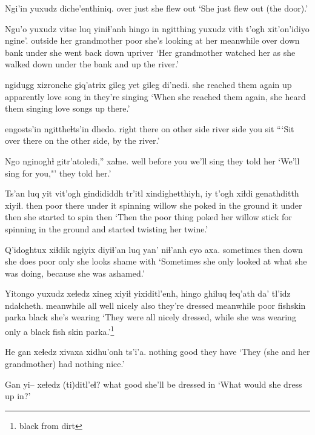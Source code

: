 \documentclass[12pt]{article}
\begin{document}
\gll Ngi'in yuxudz diche'enthiniq.
over   just  {she flew out}
\glt `She just flew out (the door).'
\glend

\gll Ngu'o yuxudz vitse           luq  yiniɬ'anh            hingo in ngitthing yuxudz vith t'ogh xit'on'idiyo       ngine'. 
outside {}    {her grandmother} poor {she's looking at her} meanwhile over   down  {}    bank under {she went back down} upriver
\glt `Her grandmother watched her as she walked down under the bank and up the river.'
\glend

 ngidugg xizronche {giq'atrix gileg} yet {gileg di'nedi.}
{{she reached them again}} up      apparently        {love  song}    in  {they're singing}
\glt `When she reached them again, she heard them singing love songs up there.'
\glend

     engosts'in      ngittheɬts'in  dhedo.
{right there} {on other side} {river side}   {you sit} 
\glt ```Sit over there on the other side, by the river.'
\glend

\gll Ngo  nginoghɬ   gitr'atoledi,'' xaɬne.
well {before you} {we'll sing}  {they told her}
\glt `We'll sing for you,"' they told her.'
\glend

\gll Ts'an luq yit   vit'ogh  gindididdh tr'itl xindighetthiyh, iy t'ogh xiɬdi genathditth         xiyiɬ.
then poor     there {under it}  spinning willow {she poked in the ground} it under then  {she started to spin} then
\glt `Then the poor thing poked her willow stick for spinning in the ground and started twisting her twine.'
\glend

\gll Q'idoghtux xiɬdik ngiyix diyiɬ'an luq yan' niɬ'anh   eyo   axa.
sometimes  then   down   {she does} poor only {she looks} shame with
\glt `Sometimes she only looked at what she was doing, because she was ashamed.'
\glend

\gll Yitongo   yuxudz xeɬedz xineg  xiyiɬ yixiditl'enh, hingo     ghiluq ɬeq'ath  da'   tl'idz ndaɬcheth. 
meanwhile all    well   nicely also  {they're dressed} meanwhile poor   fishskin parka black  {she's wearing}
\glt `They were all nicely dressed, while she was wearing only a black fish skin parka.'\footnote{black from dirt}
\glend

\gll He gan     xeɬedz {xivaxa xidhu'onh} ts'i'a.
{} nothing good   {they have}
\glt `They (she and her grandmother) had nothing nice.'
\glend

\gll Gan  yi-- xeɬedz (ti)ditl'eɬ?
what {}   good   {she'll be dressed in} 
\glt `What would she dress up in?'
\glend
\end{document}
